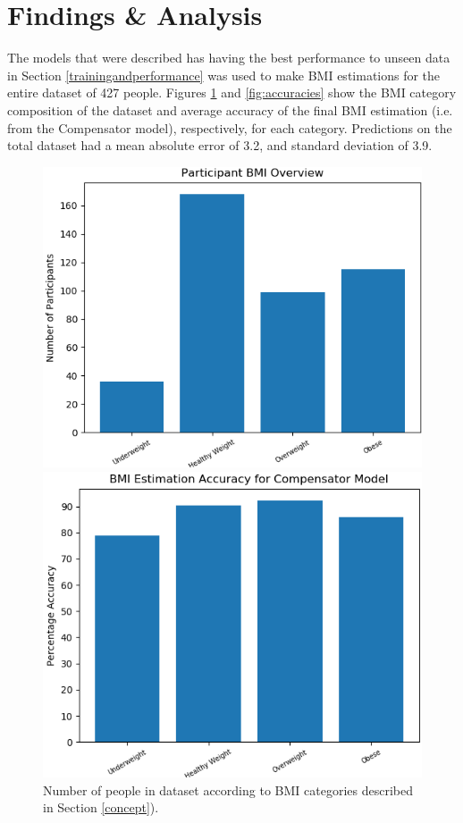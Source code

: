 \documentclass[conference]{IEEEtran}
\begin{document}
\section{Findings \& Analysis}
The models that were described has having the best performance to unseen data in Section \ref{trainingandperformance} was used to make BMI estimations for the entire dataset of 427 people.
Figures \ref{fig:spread} and \ref{fig:accuracies} show the BMI category composition of the dataset and average accuracy of the final BMI estimation (i.e. from the Compensator model), respectively, for each category.
Predictions on the total dataset had a mean absolute error of 3.2, and standard deviation of 3.9.
\begin{figure}
    \centering
    \begin{minipage}[b]{0.235\textwidth}
    	\includegraphics[width=\linewidth]{spread.png}
	\caption{Number of people in dataset according to BMI categories described in Section \ref{concept}).}
	\label{fig:spread}
    \end{minipage}
    \hspace{0.1cm}
    \begin{minipage}[b]{0.235\textwidth}
	\includegraphics[width=\linewidth]{accuracies.png}

\end{minipage}
\end{figure}
\end{document}
